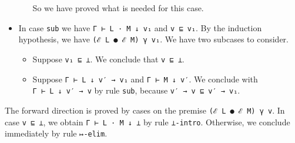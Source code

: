 \begin{itemize}
\begin{itemize}
    So we have proved what is needed for this case.
  \end{itemize}
\item
  In case \texttt{sub} we have \texttt{Γ\ ⊢\ L\ ·\ M\ ↓\ v₁} and
  \texttt{v\ ⊑\ v₁}. By the induction hypothesis, we have
  \texttt{(ℰ\ L\ ●\ ℰ\ M)\ γ\ v₁}. We have two subcases to consider.

  \begin{itemize}
  \tightlist
  \item
    Suppose \texttt{v₁\ ⊑\ ⊥}. We conclude that \texttt{v\ ⊑\ ⊥}.
  \item
    Suppose \texttt{Γ\ ⊢\ L\ ↓\ v′\ →\ v₁} and \texttt{Γ\ ⊢\ M\ ↓\ v′}.
    We conclude with \texttt{Γ\ ⊢\ L\ ↓\ v′\ →\ v} by rule \texttt{sub},
    because \texttt{v′\ →\ v\ ⊑\ v′\ →\ v₁}.
  \end{itemize}
\end{itemize}

The forward direction is proved by cases on the premise
\texttt{(ℰ\ L\ ●\ ℰ\ M)\ γ\ v}. In case \texttt{v\ ⊑\ ⊥}, we obtain
\texttt{Γ\ ⊢\ L\ ·\ M\ ↓\ ⊥} by rule \texttt{⊥-intro}. Otherwise, we
conclude immediately by rule \texttt{↦-elim}.

